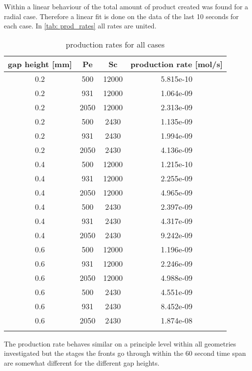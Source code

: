 \documentclass[../thesis.tex]{subfiles}
\begin{document}
Within \cite{brau2020influence} a linear behaviour of the total amount of product created was found for a radial case. Therefore a linear fit is done on the data of the last 10 seconds for each case. In \autoref{tab: prod_rates} all rates are united.
\begin{table} [htbp]
	\centering
	\caption{production rates for all cases}
	\begin{tabular}{ cccc }
		\hline
		gap height [mm] & Pe & Sc & production rate [mol/s] \\
		\hline
		0.2 & 500 & 12000 & 5.815e-10 \\
		0.2 & 931 & 12000 & 1.064e-09 \\
		0.2 & 2050 & 12000 & 2.313e-09 \\
		0.2	& 500 & 2430 & 1.135e-09 \\
		0.2	& 931 & 2430 & 1.994e-09 \\
		0.2	& 2050 & 2430 & 4.136e-09 \\
		0.4 & 500 & 12000 & 1.215e-10 \\
		0.4 & 931 & 12000 & 2.255e-09 \\
		0.4 & 2050 & 12000 & 4.965e-09 \\
		0.4	& 500 & 2430 & 2.397e-09 \\
		0.4	& 931 & 2430 & 4.317e-09 \\
		0.4	& 2050 & 2430 & 9.242e-09 \\
		0.6 & 500 & 12000 & 1.196e-09 \\
		0.6 & 931 & 12000 & 2.246e-09 \\
		0.6 & 2050 & 12000 & 4.988e-09 \\
		0.6	& 500 & 2430 & 4.551e-09 \\
		0.6	& 931 & 2430 & 8.452e-09 \\
		0.6	& 2050 & 2430 & 1.874e-08 \\
		\hline
		\label{tab: prod_rates}
	\end{tabular}
\end{table}

The production rate behaves similar on a principle level within all geometries investigated but the stages the fronts go through within the 60 second time span are somewhat different for the different gap heights.
\end{document}
